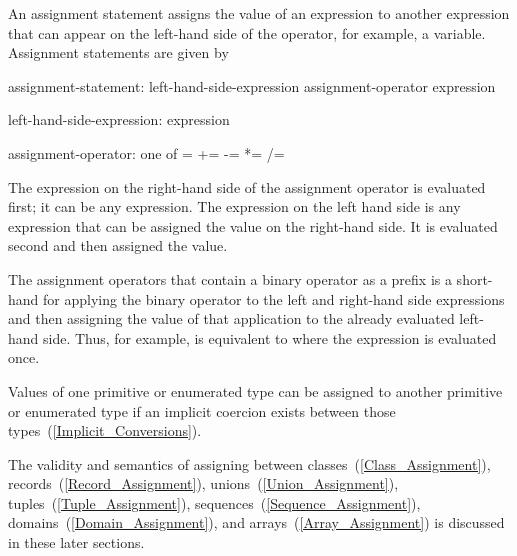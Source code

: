 An assignment statement assigns the value of an expression to another
expression that can appear on the left-hand side of the operator, for
example, a variable.  Assignment statements are given by

\begin{syntax}
assignment-statement:
  left-hand-side-expression assignment-operator expression

left-hand-side-expression:
  expression

assignment-operator: one of
   = += -= *= /= %
\end{syntax}

The expression on the right-hand side of the assignment operator is
evaluated first; it can be any expression.  The expression on the left
hand side is any expression that can be assigned the value on the
right-hand side.  It is evaluated second and then assigned the value.

The assignment operators that contain a binary operator as a prefix is
a short-hand for applying the binary operator to the left and right-hand
side expressions and
then assigning the value of that application to the already evaluated
left-hand side.  Thus, for example,  is equivalent to
 where the expression  is evaluated once.

Values of one primitive or enumerated type can be assigned to another
primitive or enumerated type if an implicit coercion exists between
those types~(\ref{Implicit_Conversions}).

The validity and semantics of assigning between
classes~(\ref{Class_Assignment}), records~(\ref{Record_Assignment}),
unions~(\ref{Union_Assignment}), tuples~(\ref{Tuple_Assignment}),
sequences~(\ref{Sequence_Assignment}),
domains~(\ref{Domain_Assignment}), and arrays~(\ref{Array_Assignment})
is discussed in these later sections.
